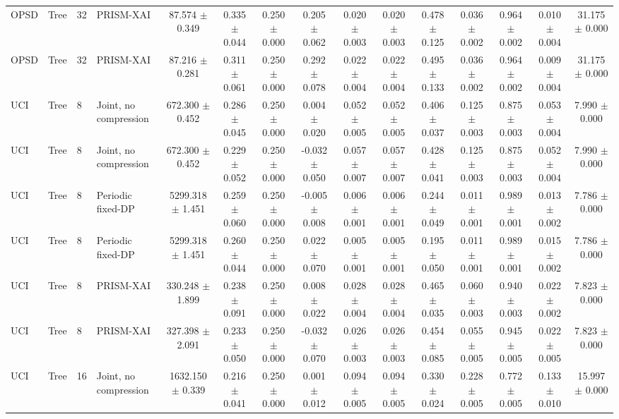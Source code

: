 \begin{table}[t]
\begin{tabular}{llllccccccccccc}
OPSD & Tree & 32 & PRISM-XAI & 87.574 $\pm$ 0.349 & 0.335 $\pm$ 0.044 & 0.250 $\pm$ 0.000 & 0.205 $\pm$ 0.062 & 0.020 $\pm$ 0.003 & 0.020 $\pm$ 0.003 & 0.478 $\pm$ 0.125 & 0.036 $\pm$ 0.002 & 0.964 $\pm$ 0.002 & 0.010 $\pm$ 0.004 & 31.175 $\pm$ 0.000 \\
OPSD & Tree & 32 & PRISM-XAI & 87.216 $\pm$ 0.281 & 0.311 $\pm$ 0.061 & 0.250 $\pm$ 0.000 & 0.292 $\pm$ 0.078 & 0.022 $\pm$ 0.004 & 0.022 $\pm$ 0.004 & 0.495 $\pm$ 0.133 & 0.036 $\pm$ 0.002 & 0.964 $\pm$ 0.002 & 0.009 $\pm$ 0.004 & 31.175 $\pm$ 0.000 \\
UCI & Tree & 8 & Joint, no compression & 672.300 $\pm$ 0.452 & 0.286 $\pm$ 0.045 & 0.250 $\pm$ 0.000 & 0.004 $\pm$ 0.020 & 0.052 $\pm$ 0.005 & 0.052 $\pm$ 0.005 & 0.406 $\pm$ 0.037 & 0.125 $\pm$ 0.003 & 0.875 $\pm$ 0.003 & 0.053 $\pm$ 0.004 & 7.990 $\pm$ 0.000 \\
UCI & Tree & 8 & Joint, no compression & 672.300 $\pm$ 0.452 & 0.229 $\pm$ 0.052 & 0.250 $\pm$ 0.000 & -0.032 $\pm$ 0.050 & 0.057 $\pm$ 0.007 & 0.057 $\pm$ 0.007 & 0.428 $\pm$ 0.041 & 0.125 $\pm$ 0.003 & 0.875 $\pm$ 0.003 & 0.052 $\pm$ 0.004 & 7.990 $\pm$ 0.000 \\
UCI & Tree & 8 & Periodic fixed-DP & 5299.318 $\pm$ 1.451 & 0.259 $\pm$ 0.060 & 0.250 $\pm$ 0.000 & -0.005 $\pm$ 0.008 & 0.006 $\pm$ 0.001 & 0.006 $\pm$ 0.001 & 0.244 $\pm$ 0.049 & 0.011 $\pm$ 0.001 & 0.989 $\pm$ 0.001 & 0.013 $\pm$ 0.002 & 7.786 $\pm$ 0.000 \\
UCI & Tree & 8 & Periodic fixed-DP & 5299.318 $\pm$ 1.451 & 0.260 $\pm$ 0.044 & 0.250 $\pm$ 0.000 & 0.022 $\pm$ 0.070 & 0.005 $\pm$ 0.001 & 0.005 $\pm$ 0.001 & 0.195 $\pm$ 0.050 & 0.011 $\pm$ 0.001 & 0.989 $\pm$ 0.001 & 0.015 $\pm$ 0.002 & 7.786 $\pm$ 0.000 \\
UCI & Tree & 8 & PRISM-XAI & 330.248 $\pm$ 1.899 & 0.238 $\pm$ 0.091 & 0.250 $\pm$ 0.000 & 0.008 $\pm$ 0.022 & 0.028 $\pm$ 0.004 & 0.028 $\pm$ 0.004 & 0.465 $\pm$ 0.035 & 0.060 $\pm$ 0.003 & 0.940 $\pm$ 0.003 & 0.022 $\pm$ 0.002 & 7.823 $\pm$ 0.000 \\
UCI & Tree & 8 & PRISM-XAI & 327.398 $\pm$ 2.091 & 0.233 $\pm$ 0.050 & 0.250 $\pm$ 0.000 & -0.032 $\pm$ 0.070 & 0.026 $\pm$ 0.003 & 0.026 $\pm$ 0.003 & 0.454 $\pm$ 0.085 & 0.055 $\pm$ 0.005 & 0.945 $\pm$ 0.005 & 0.022 $\pm$ 0.005 & 7.823 $\pm$ 0.000 \\
UCI & Tree & 16 & Joint, no compression & 1632.150 $\pm$ 0.339 & 0.216 $\pm$ 0.041 & 0.250 $\pm$ 0.000 & 0.001 $\pm$ 0.012 & 0.094 $\pm$ 0.005 & 0.094 $\pm$ 0.005 & 0.330 $\pm$ 0.024 & 0.228 $\pm$ 0.005 & 0.772 $\pm$ 0.005 & 0.133 $\pm$ 0.010 & 15.997 $\pm$ 0.000 \\

\end{tabular}
\end{table}
